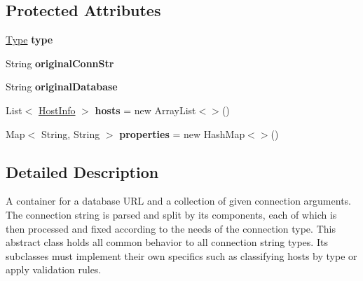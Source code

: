 \subsection*{Protected Attributes}
\begin{DoxyCompactItemize}
\item 
\mbox{\label{classcom_1_1mysql_1_1cj_1_1conf_1_1_connection_url_a7086957f46b62fc28263e76fb9159a3c}} 
\mbox{\hyperlink{enumcom_1_1mysql_1_1cj_1_1conf_1_1_connection_url_1_1_type}{Type}} {\bfseries type}
\item 
\mbox{\label{classcom_1_1mysql_1_1cj_1_1conf_1_1_connection_url_acb1dfbbdde68f9e171c3a525d3763801}} 
String {\bfseries original\+Conn\+Str}
\item 
\mbox{\label{classcom_1_1mysql_1_1cj_1_1conf_1_1_connection_url_a73a936ed6806d19dd308b401cb8f160c}} 
String {\bfseries original\+Database}
\item 
\mbox{\label{classcom_1_1mysql_1_1cj_1_1conf_1_1_connection_url_ab774f53dab294218bc6b2cf1af73a905}} 
List$<$ \mbox{\hyperlink{classcom_1_1mysql_1_1cj_1_1conf_1_1_host_info}{Host\+Info}} $>$ {\bfseries hosts} = new Array\+List$<$$>$()
\item 
\mbox{\label{classcom_1_1mysql_1_1cj_1_1conf_1_1_connection_url_afc53ba40da35bf161d2df6fbd785b09b}} 
Map$<$ String, String $>$ {\bfseries properties} = new Hash\+Map$<$$>$()
\end{DoxyCompactItemize}


\subsection{Detailed Description}
A container for a database U\+RL and a collection of given connection arguments. The connection string is parsed and split by its components, each of which is then processed and fixed according to the needs of the connection type. This abstract class holds all common behavior to all connection string types. Its subclasses must implement their own specifics such as classifying hosts by type or apply validation rules. 


